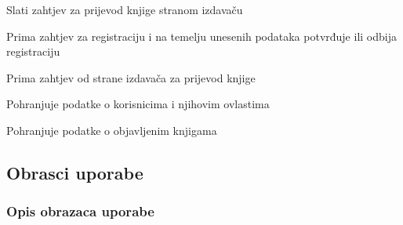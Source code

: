 \begin{packed_enum}
\begin{packed_enum}
				\end{packed_enum}

				\item {}

                				\begin{packed_enum}
                    					\item Slati zahtjev za prijevod knjige stranom izdavaču
                				\end{packed_enum}

                			\item {}
                			\begin{packed_enum}
                    				\item Prima zahtjev za registraciju i na temelju unesenih podataka potvrđuje ili odbija registraciju
                			\end{packed_enum}

                			\item {}
                			\begin{packed_enum}
                    				\item Prima zahtjev od strane izdavača za prijevod knjige
                			\end{packed_enum}

                			\item {}
                			\begin{packed_enum}
                    				\item Pohranjuje podatke o korisnicima i njihovim ovlastima
                    				\item Pohranjuje podatke o objavljenim knjigama
                			\end{packed_enum}
			\end{packed_enum}
			
			\eject 
			
			
			\subsection{Obrasci uporabe}
				

				
				\subsubsection{Opis obrazaca uporabe}				
					\noindent {}
            
